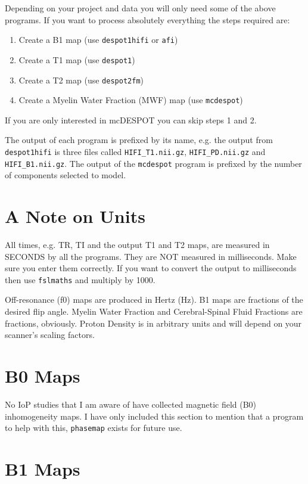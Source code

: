 \documentclass{report}
\begin{document}
Depending on your project and data you will only need some of the above programs. If you want to process absolutely everything the steps required are:

\begin{enumerate}\itemsep1pt \parskip0pt 
	\item Create a B1 map (use \texttt{despot1hifi} or \texttt{afi})
	\item Create a T1 map (use \texttt{despot1})
	\item Create a T2 map (use \texttt{despot2fm})
	\item Create a Myelin Water Fraction (MWF) map (use \texttt{mcdespot})
\end{enumerate}

If you are only interested in mcDESPOT you can skip steps 1 and 2.

The output of each program is prefixed by its name, e.g. the output from \texttt{despot1hifi} is three files called \texttt{HIFI\_T1.nii.gz}, \texttt{HIFI\_PD.nii.gz} and \texttt{HIFI\_B1.nii.gz}. The output of the \texttt{mcdespot} program is prefixed by the number of components selected to model.

\section{A Note on Units}

All times, e.g. TR, TI and the output T1 and T2 maps, are measured in SECONDS by all the programs. They are NOT measured in milliseconds. Make sure you enter them correctly. If you want to convert the output to milliseconds then use \texttt{fslmaths} and multiply by 1000.

Off-resonance (f0) maps are produced in Hertz (Hz). B1 maps are fractions of the desired flip angle. Myelin Water Fraction and Cerebral-Spinal Fluid Fractions are fractions, obviously. Proton Density is in arbitrary units and will depend on your scanner's scaling factors.

\section{B0 Maps}

No IoP studies that I am aware of have collected magnetic field (B0) inhomogeneity maps. I have only included this section to mention that a program to help with this, \texttt{phasemap} exists for future use.

\section{B1 Maps}
\end{document}
